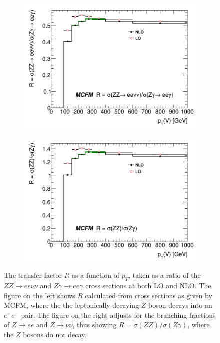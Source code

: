 \documentclass[12pt,a4paper,openright,twoside]{report}
\begin{document}
\begin{figure}[H]
\centering
	\begin{subfigure}{0.49\textwidth}
		\includegraphics[width=\linewidth]{R.png}
		\caption{}
		\label{fig:Rcurve}
	\end{subfigure}
	\begin{subfigure}{0.49\textwidth}
		\includegraphics[width=\linewidth]{R_BR.png}
		\caption{}
		\label{fig:RcurveBR}
	\end{subfigure}
	\caption{The transfer factor $R$ as a function of $p_T$, taken as a ratio of  the $ZZ\to ee\nu\nu$ and $Z\gamma\to ee\gamma$ cross sections at both LO and NLO. The figure on the left shows $R$ calculated from cross sections as given by MCFM, where the the leptonically decaying $Z$ boson decays into an $e^+e^-$ pair. The figure on the right adjusts for the branching fractions of $Z\to ee$ and $Z\to\nu\nu$, thus showing $R = \sigma(ZZ)/\sigma(Z\gamma)$, where the $Z$ bosons do not decay.}
\end{figure}
\end{document}
